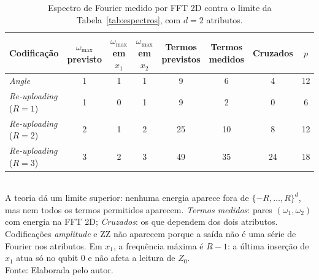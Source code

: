 \begin{table}[htb]
\centering
\small
\setlength{\tabcolsep}{4pt}
\caption[Espectro de Fourier medido]{Espectro de Fourier medido por FFT 2D contra o limite da Tabela~\ref{tab:espectros}, com $d = 2$ atributos.}
\label{tab:espectro}
\begin{tabular}{lccccccc}
\toprule
Codificação & \shortstack{$\omega_{\max}$\\previsto} & \shortstack{$\omega_{\max}$\\em $x_1$} & \shortstack{$\omega_{\max}$\\em $x_2$} & \shortstack{Termos\\previstos} & \shortstack{Termos\\medidos} & Cruzados & $p$ \\
\midrule
\textit{Angle} & 1 & 1 & 1 & 9 & 6 & 4 & 12 \\
\textit{Re-uploading} ($R = 1$) & 1 & 0 & 1 & 9 & 2 & 0 & 6 \\
\textit{Re-uploading} ($R = 2$) & 2 & 1 & 2 & 25 & 10 & 8 & 12 \\
\textit{Re-uploading} ($R = 3$) & 3 & 2 & 3 & 49 & 35 & 24 & 18 \\
\bottomrule
\end{tabular}
\\[2pt]
{\footnotesize A teoria dá um limite superior: nenhuma energia aparece fora de $\{-R, \dots, R\}^d$, mas nem todos os termos permitidos aparecem. \textit{Termos medidos}: pares $(\omega_1, \omega_2)$ com energia na FFT 2D; \textit{Cruzados}: os que dependem dos dois atributos. Codificações \textit{amplitude} e ZZ não aparecem porque a saída não é uma série de Fourier nos atributos. Em $x_1$, a frequência máxima é $R - 1$: a última inserção de $x_1$ atua só no qubit 0 e não afeta a leitura de $Z_0$.}
\\[2pt]
{\footnotesize Fonte: Elaborada pelo autor.}
\end{table}
